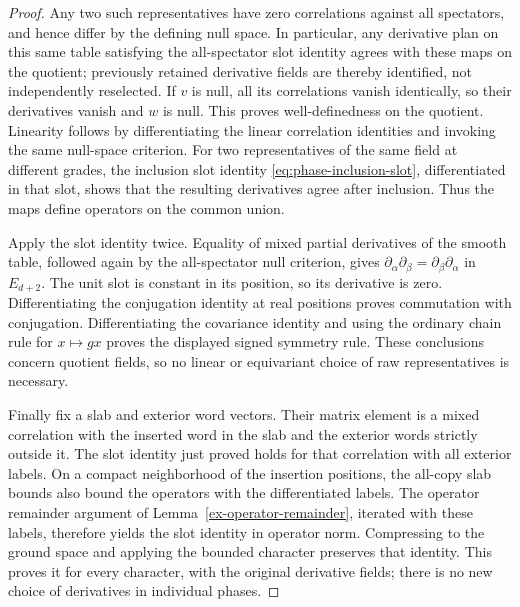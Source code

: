 \begin{proof}
Any two such representatives have zero correlations against all
spectators, and hence differ by the defining null space. In particular,
any derivative plan on this same table satisfying the all-spectator slot
identity agrees with these maps on the quotient; previously retained
derivative fields are thereby identified, not independently reselected. If $v$ is null,
all its correlations vanish identically, so their derivatives vanish and
$w$ is null. This proves well-definedness on the quotient. Linearity
follows by differentiating the linear correlation identities and invoking
the same null-space criterion. For two representatives of the same field
at different grades, the inclusion slot identity
\eqref{eq:phase-inclusion-slot}, differentiated in that slot, shows that
the resulting derivatives agree after inclusion. Thus the maps define
operators on the common union.

Apply the slot identity twice. Equality of mixed partial derivatives of
the smooth table, followed again by the all-spectator null criterion,
gives $\partial_\alpha\partial_\beta=
\partial_\beta\partial_\alpha$ in $E_{d+2}$. The unit slot is constant
in its position, so its derivative is zero. Differentiating the
conjugation identity at real positions proves commutation with
conjugation. Differentiating the covariance identity and using the
ordinary chain rule for $x\mapsto gx$ proves the displayed signed
symmetry rule. These conclusions concern quotient fields, so no linear
or equivariant choice of raw representatives is necessary.

Finally fix a slab and exterior word vectors. Their matrix element is
a mixed correlation with the inserted word in the slab and the
exterior words strictly outside it. The slot identity just proved holds
for that correlation with all exterior labels. On a compact neighborhood
of the insertion positions, the all-copy slab bounds also bound the
operators with the differentiated labels. The operator remainder
argument of Lemma~\ref{ex-operator-remainder}, iterated with these labels,
therefore yields the slot identity in operator norm. Compressing to the
ground space and applying the bounded character preserves that identity.
This proves it for every character, with the original derivative fields;
there is no new choice of derivatives in individual phases.
\end{proof}
